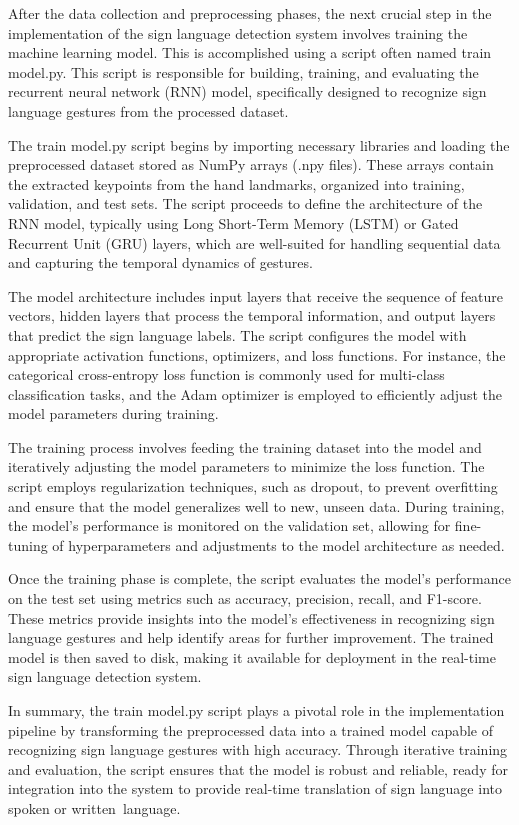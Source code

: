 After the data collection and preprocessing phases, the next crucial step in the implementation of the sign language detection system involves training the machine learning model. This is accomplished using a script often named train model.py. This script is responsible for building, training, and evaluating the recurrent neural network (RNN) model, specifically designed to recognize sign language gestures from the processed dataset.

The train model.py script begins by importing necessary libraries and loading the preprocessed dataset stored as NumPy arrays (.npy files). These arrays contain the extracted keypoints from the hand landmarks, organized into training, validation, and test sets. The script proceeds to define the architecture of the RNN model, typically using Long Short-Term Memory (LSTM) or Gated Recurrent Unit (GRU) layers, which are well-suited for handling sequential data and capturing the temporal dynamics of gestures.

The model architecture includes input layers that receive the sequence of feature vectors, hidden layers that process the temporal information, and output layers that predict the sign language labels. The script configures the model with appropriate activation functions, optimizers, and loss functions. For instance, the categorical cross-entropy loss function is commonly used for multi-class classification tasks, and the Adam optimizer is employed to efficiently adjust the model parameters during training.

The training process involves feeding the training dataset into the model and iteratively adjusting the model parameters to minimize the loss function. The script employs regularization techniques, such as dropout, to prevent overfitting and ensure that the model generalizes well to new, unseen data. During training, the model's performance is monitored on the validation set, allowing for fine-tuning of hyperparameters and adjustments to the model architecture as needed.

Once the training phase is complete, the script evaluates the model's performance on the test set using metrics such as accuracy, precision, recall, and F1-score. These metrics provide insights into the model's effectiveness in recognizing sign language gestures and help identify areas for further improvement. The trained model is then saved to disk, making it available for deployment in the real-time sign language detection system.

In summary, the train model.py script plays a pivotal role in the implementation pipeline by transforming the preprocessed data into a trained model capable of recognizing sign language gestures with high accuracy. Through iterative training and evaluation, the script ensures that the model is robust and reliable, ready for integration into the system to provide real-time translation of sign language into spoken or written language.